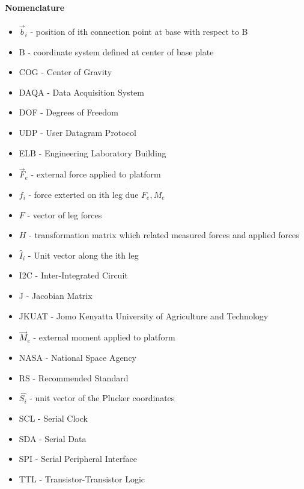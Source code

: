 \paragraph{Nomenclature}
\begin{itemize}
\item $\vec{b}_i$ - position of ith connection point at base with respect to B
\item B - coordinate system defined at center of base plate
\item COG - Center of Gravity
\item DAQA - Data Acquisition System
\item DOF - Degrees of Freedom
\item UDP - User Datagram Protocol
\item ELB - Engineering Laboratory Building
\item $\vec{F}_e$ - external force applied to platform
\item $f_i$ - force exterted on ith leg due $F_e, M_e$
\item $F$ - vector of leg forces
\item $H$ - transformation matrix which related measured forces and applied forces
\item $\hat{I}_i$ - Unit vector along the ith leg 
\item I2C - Inter-Integrated Circuit 
\item J - Jacobian Matrix 
\item JKUAT - Jomo Kenyatta University of Agriculture and Technology
\item $\vec{M}_e$ - external moment applied to platform
\item NASA - National Space Agency
\item RS - Recommended Standard
\item $\hat{{S_{i}}}$ - unit vector of the Plucker coordinates
\item SCL - Serial Clock
\item SDA - Serial Data
\item SPI - Serial Peripheral Interface
\item TTL - Transistor-Transistor Logic
\end{itemize}
\pagebreak